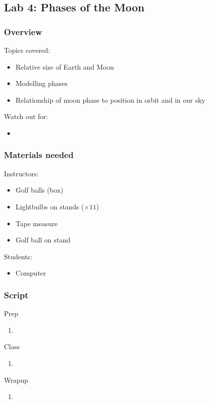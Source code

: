 \documentclass[12pt]{article}
\begin{document}
\newpage
\subsection{Lab 4: Phases of the Moon}
\subsubsection{Overview}
Topics covered:
\begin{itemize}
\item Relative size of Earth and Moon
\item Modelling phases
\item Relationship of moon phase to position in orbit and in our sky
\end{itemize}
Watch out for:
\begin{itemize}
\item 
\end{itemize}

\subsubsection{Materials needed}
Instructors:
\begin{itemize}
  \item Golf balls (box)
  \item Lightbulbs on stands ($\times 11$)
  \item Tape measure
  \item Golf ball on stand
\end{itemize}
Students:
\begin{itemize}
  \item Computer
\end{itemize}

\subsubsection{Script}
Prep
\begin{enumerate}
\item
\end{enumerate}
Class
\begin{enumerate}
\item
\end{enumerate}
Wrapup
\begin{enumerate}
\item
\end{enumerate}
\end{document}
